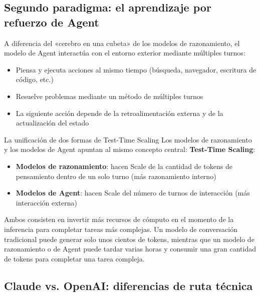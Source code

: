 \documentclass[a4paper]{article}
\begin{document}
\subsection{Segundo paradigma: el aprendizaje por refuerzo de Agent}

A diferencia del «cerebro en una cubeta» de los modelos de razonamiento, el modelo de Agent interactúa con el entorno exterior mediante múltiples turnos:

\begin{itemize}
    \item Piensa y ejecuta acciones al mismo tiempo (búsqueda, navegador, escritura de código, etc.)
    \item Resuelve problemas mediante un método de múltiples turnos
    \item La siguiente acción depende de la retroalimentación externa y de la actualización del estado
\end{itemize}

\begin{importantbox}{La unificación de dos formas de Test-Time Scaling}
Los modelos de razonamiento y los modelos de Agent apuntan al mismo concepto central: \textbf{Test-Time Scaling}:
\begin{itemize}
    \item \textbf{Modelos de razonamiento}: hacen Scale de la cantidad de tokens de pensamiento dentro de un solo turno (más razonamiento interno)
    \item \textbf{Modelos de Agent}: hacen Scale del número de turnos de interacción (más interacción externa)
\end{itemize}
Ambos consisten en invertir más recursos de cómputo en el momento de la inferencia para completar tareas más complejas. Un modelo de conversación tradicional puede generar solo unos cientos de tokens, mientras que un modelo de razonamiento o de Agent puede tardar varias horas y consumir una gran cantidad de tokens para completar una tarea compleja.
\end{importantbox}

\subsection{Claude vs. OpenAI: diferencias de ruta técnica}
\end{document}
